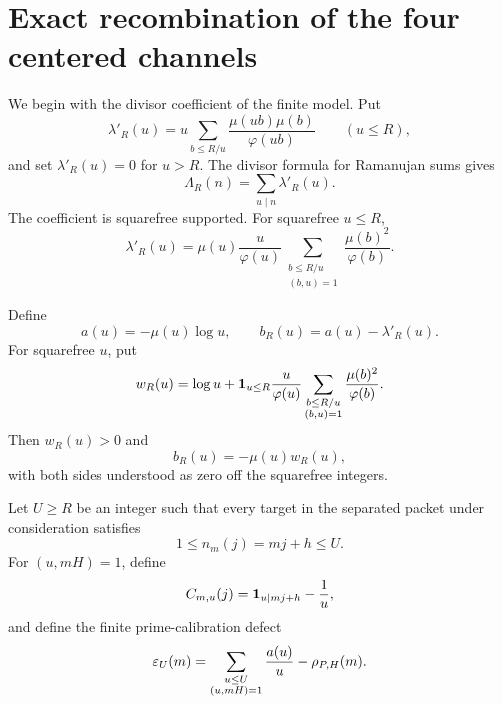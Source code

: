 \section{Exact recombination of the four centered channels}
\label{sec:tpc20-recombination}

We begin with the divisor coefficient of the finite model.  Put
\begin{equation}
 \lambda'_R(u)
 =u\sum_{b\le R/u}
 \frac{\mu(ub)\mu(b)}{\varphi(ub)}
 \qquad(u\le R),
 \label{eq:tpc20-lambda-prime}
\end{equation}
and set \(\lambda'_R(u)=0\) for \(u>R\).  The divisor formula for
Ramanujan sums gives
\begin{equation}
 \Lambda_R(n)=\sum_{u\mid n}\lambda'_R(u).
 \label{eq:tpc20-model-divisor}
\end{equation}
The coefficient is squarefree supported.  For squarefree \(u\le R\),
\begin{equation}
 \lambda'_R(u)
 =\mu(u)\frac{u}{\varphi(u)}
 \sum_{\substack{b\le R/u\\(b,u)=1}}
 \frac{\mu(b)^2}{\varphi(b)}.
 \label{eq:tpc20-lambda-positive}
\end{equation}

Define
\begin{equation}
 a(u)=-\mu(u)\log u,\qquad
 b_R(u)=a(u)-\lambda'_R(u).
 \label{eq:tpc20-ab-coefficients}
\end{equation}
For squarefree \(u\), put
\begin{equation}
 w_R(u)
 =\log u+
 \mathbf 1_{u\le R}\frac{u}{\varphi(u)}
 \sum_{\substack{b\le R/u\\(b,u)=1}}
 \frac{\mu(b)^2}{\varphi(b)}.
 \label{eq:tpc20-wR}
\end{equation}
Then \(w_R(u)>0\) and
\begin{equation}
 b_R(u)=-\mu(u)w_R(u),
 \label{eq:tpc20-bR-mobius}
\end{equation}
with both sides understood as zero off the squarefree integers.

Let \(U\ge R\) be an integer such that every target in the separated
packet under consideration satisfies
\begin{equation}
 1\le n_m(j)=mj+h\le U.
 \label{eq:tpc20-target-horizon}
\end{equation}
For \((u,mH)=1\), define
\begin{equation}
 C_{m,u}(j)=\mathbf 1_{u\mid mj+h}-\frac1u,
 \label{eq:tpc20-common-centered-kernel}
\end{equation}
and define the finite prime-calibration defect
\begin{equation}
 \varepsilon_U(m)
 =\sum_{\substack{u\le U\\(u,mH)=1}}\frac{a(u)}u
  -\rho_{P,H}(m).
 \label{eq:tpc20-calibration-defect}
\end{equation}


